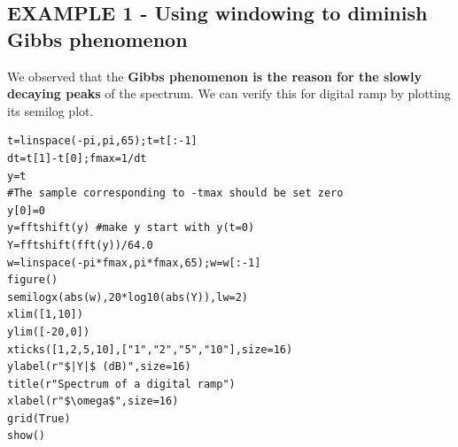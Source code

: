 \documentclass[11pt, a4paper]{article}
\begin{document}
\subsection{EXAMPLE 1 - Using windowing to diminish Gibbs phenomenon} 
{
We observed that the \textbf{Gibbs phenomenon is the reason for the slowly decaying peaks} of the spectrum. We can verify this for digital ramp by plotting its semilog plot.
}
\begin{verbatim}
t=linspace(-pi,pi,65);t=t[:-1]
dt=t[1]-t[0];fmax=1/dt
y=t
#The sample corresponding to -tmax should be set zero
y[0]=0 
y=fftshift(y) #make y start with y(t=0)
Y=fftshift(fft(y))/64.0
w=linspace(-pi*fmax,pi*fmax,65);w=w[:-1]
figure()
semilogx(abs(w),20*log10(abs(Y)),lw=2)
xlim([1,10])
ylim([-20,0])
xticks([1,2,5,10],["1","2","5","10"],size=16)
ylabel(r"$|Y|$ (dB)",size=16)
title(r"Spectrum of a digital ramp")
xlabel(r"$\omega$",size=16)
grid(True)
show()
\end{verbatim}
\end{document}
